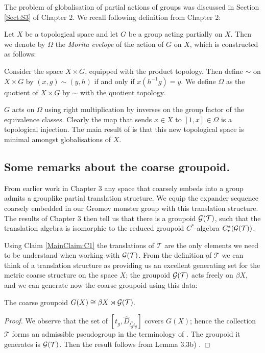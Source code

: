 \begin{example}
The problem of globalisation of partial actions of groups was discussed in Section \ref{Sect:S3} of Chapter 2. We recall following definition from Chapter 2:
\begin{definition}
Let $X$ be a topological space and let $G$ be a group acting partially on $X$. Then we denote by $\Omega$ the \textit{Morita evelope} of the action of $G$ on $X$, which is constructed as follows:

Consider the space $X\times G$, equipped with the product topology. Then define $\sim$ on $X\times G$ by $(x,g)\sim (y,h)$ if and only if $x(h^{-1}g)=y$. We define $\Omega$ as the quotient of $X\times G$ by $\sim$ with the quotient topology. 

$G$ acts on $\Omega$ using right multiplication by inverses on the group factor of the equivalence classes. Clearly the map that sends $x \in X$ to $[1,x] \in \Omega$ is a topological injection. The main result of \cite{MR2041539} is that this new topological space is minimal amongst globalisations of $X$.
\end{definition}

\subsection{Some remarks about the coarse groupoid.}

From earlier work in Chapter 3 any space that coarsely embeds into a group admits a grouplike partial translation structure. We equip the expander sequence coarsely embedded in our Gromov monster group with this translation structure. The results of Chapter 3 then tell us that there is a groupoid $\mathcal{G}(\mathcal{T})$, such that the translation algebra is isomorphic to the reduced groupoid  $C^{*}$-algebra $C^{*}_{r}(\mathcal{G}(\mathcal{T}))$. 

Using Claim \ref{MainClaim:C1} the translations of $\mathcal{T}$ are the only elements we need to be understand when working with $\mathcal{G}(\mathcal{T})$. From the definition of $\mathcal{T}$ we can think of a translation structure as providing us an excellent generating set for the metric coarse structure on the space $X$; the groupoid $\mathcal{G}(\mathcal{T})$ acts freely on $\beta X$, and we can generate now the coarse groupoid using this data:

\begin{lemma}\label{Lem:CG}
The coarse groupoid $G(X) \cong \beta X \rtimes \mathcal{G}(\mathcal{T}).$
\end{lemma}
\begin{proof}
We observe that the set of $[t_{g},\widehat{D}_{t_{g}^{*}t_{g}}]$ covers $G(X)$; hence the collection $\mathcal{T}$ forms an admissible pseudogroup in the terminology of \cite{MR1905840}. The groupoid it generates is $\mathcal{G}(\mathcal{T})$. Then the result follows from Lemma 3.3b) \cite{MR1905840}.
\end{proof}


\end{example}
